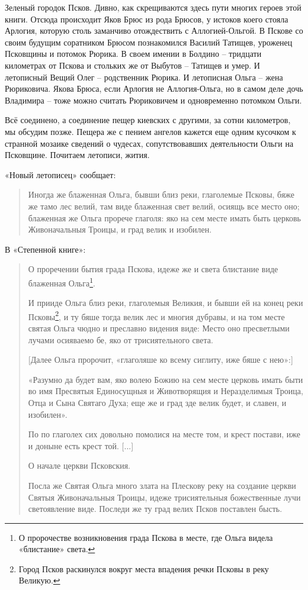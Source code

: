 Зеленый городок Псков. Дивно, как скрещиваются здесь пути многих героев этой книги. Отсюда происходит Яков Брюс из рода Брюсов, у истоков коего стояла Арлогия, которую столь заманчиво отождествить с Аллогией-Ольгой. В Пскове со своим будущим соратником Брюсом познакомился Василий Татищев, уроженец Псковщины и потомок Рюрика. В своем имении в Болдино – тридцати километрах от Пскова и стольких же от Выбутов – Татищев и умер. И летописный Вещий Олег – родственник Рюрика. И летописная Ольга – жена Рюриковича. Якова Брюса, если Арлогия не Аллогия-Ольга, но в самом деле дочь Владимира – тоже можно считать Рюриковичем и одновременно потомком Ольги.

Всё соединено, а соединение пещер киевских с другими, за сотни километров, мы обсудим позже. Пещера же с пением ангелов кажется еще одним кусочком к странной мозаике сведений о чудесах, сопутствовавших деятельности Ольги на Псковщине. Почитаем летописи, жития.

«Новый летописец» сообщает:

\begin{quotation}
Иногда же блаженная Ольга, бывши близ реки, глаголемые Псковы, бяже же тамо лес велий, там виде блаженная свет велий, осиящь все место оно; блаженная же Ольга прорече глаголя: яко на сем месте имать быть церковь Живоначальныя Троицы, и град велик и изобилен.
\end{quotation}

В «Степенной книге»:

\begin{quotation}
О проречении бытия града Пскова, идеже же и света блистание виде блаженная Ольга\footnote{О пророчестве возникновения града Пскова в месте, где Ольга видела «блистание» света.}.

И прииде Ольга близ реки, глаголемыя Великия, и бывши ей на конец реки Псковы\footnote{Город Псков раскинулся вокруг места впадения речки Псковы в реку Великую.}, и ту бяше тогда велик лес и многия дубравы, и на том месте святая Ольга чюдно и преславно видения виде: Место оно пресветлыми лучами осияваемо бе, яко от трисиятельного света.

[Далее Ольга пророчит, «глаголяше ко всему сиглиту, иже бяше с нею»:]

«Разумно да будет вам, яко волею Божию на сем месте церковь имать быти во имя Пресвятыя Единосущныя и Животворящия и Неразделимыя Троица, Отца и Сына Святаго Духа; еще же и град зде велик будет, и славен, и изобилен».

По по глаголех сих довольно помолися на месте том, и крест постави, иже и доныне есть крест той. [...]

О начале церкви Псковския. 

Посла же Святая Ольга много злата на Плескову реку на создание церкви Святыя Живоначальныя Троицы, идеже трисиятельныя божественные лучи светоявление виде. Последи же ту град велих Псков поставлен бысть.
\end{quotation}

